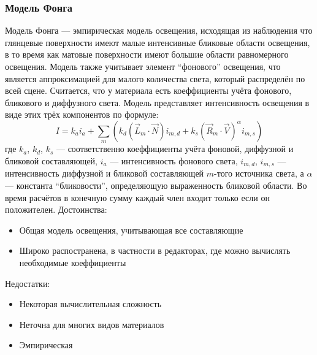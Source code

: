 \documentclass[a4paper,12pt]{report}
\numberwithin{equation}{section}
\begin{document}
\subsubsection*{Модель Фонга}
Модель Фонга --- эмпирическая модель освещения, исходящая из наблюдения что глянцевые поверхности имеют малые интенсивные бликовые области освещения, в то время как матовые поверхности имеют большие области равномерного освещения. Модель также учитывает элемент ``фонового'' освещения, что является аппроксимацией для малого количества света, который распределён по всей сцене. Считается, что у материала есть коеффициенты учёта фонового, бликового и диффузного света. Модель представляет интенсивность освещения в виде этих трёх компонентов по формуле:
\begin{equation}
I = k_a i_a + \sum_m (k_d (\vec{L}_m \cdot \vec{N}) i_{m,d} + k_s (\vec{R}_m \cdot \vec{V})^{\alpha}i_{m,s})
\end{equation}
где $k_a$, $k_d$, $k_s$ --- соответственно коеффициенты учёта фоновой, диффузной и бликовой составляющей, $i_a$ --- интенсивность фонового света, $i_{m,d}$, $i_{m,s}$ --- интенсивность диффузной и бликовой составляющей $m$-того источника света, а $\alpha$ --- константа ``бликовости'', определяющую выраженность бликовой области. Во время расчётов в конечную сумму каждый член входит только если он положителен.
Достоинства:
\begin{itemize}
\item Общая модель освещения, учитывающая все составляющие
\item Широко распостранена, в частности в редакторах, где можно вычислять необходимые коеффициенты
\end{itemize}
Недостатки:
\begin{itemize}
\item Некоторая вычислительная сложность
\item Неточна для многих видов материалов
\item Эмпирическая
\end{itemize}
\end{document}
